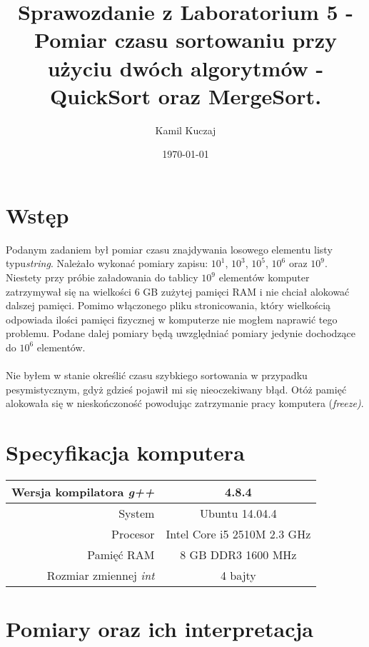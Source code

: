 \documentclass[11pt,a4paper]{article}
\author{Kamil Kuczaj}
\title{Sprawozdanie z Laboratorium 5 - Pomiar czasu sortowaniu przy użyciu dwóch algorytmów - QuickSort oraz MergeSort.}
\date{\today}
\begin{document}
\maketitle

\section{Wstęp}
Podanym zadaniem był pomiar czasu znajdywania losowego elementu listy typu\textit{string}. Należało wykonać pomiary zapisu: $10^1$, $10^3$, $10^5$, $10^6$ oraz $10^9$. Niestety przy próbie załadowania do tablicy $10^9$ elementów komputer zatrzymywał się na wielkości 6 GB zużytej pamięci RAM i nie chciał alokować dalszej pamięci. Pomimo włączonego pliku stronicowania, który wielkością odpowiada ilości pamięci fizycznej w komputerze nie mogłem naprawić tego problemu. Podane dalej pomiary będą uwzględniać pomiary jedynie dochodzące do $10^6$ elementów.\\\\Nie byłem w stanie określić czasu szybkiego sortowania w przypadku pesymistycznym, gdyż gdzieś pojawił mi się nieoczekiwany błąd. Otóż pamięć alokowała się w nieskończoność powodując zatrzymanie pracy komputera (\textit{freeze)}.

\section{Specyfikacja komputera}

\begin{center}
	\begin{tabular}{| r | c |}
	\hline
	Wersja kompilatora \textit{g++} & 4.8.4 \\ \hline
	System & Ubuntu 14.04.4 \\ \hline
	Procesor	 & Intel Core i5 2510M 2.3 GHz \\ \hline
	Pamięć RAM & 8 GB DDR3 1600 MHz \\ \hline
	Rozmiar zmiennej \textit{int} & 4 bajty \\ \hline
	\end{tabular}
\end{center}
\newpage	

\section{Pomiary oraz ich interpretacja}
\bigskip
\end{document}
